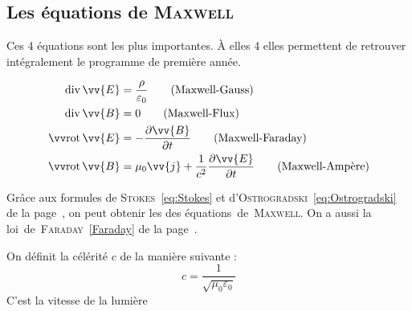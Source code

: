 \documentclass[11pt,a4paper,fleqn,pdftex]{report}
\begin{document}
\subsection{Les équations de \textsc{Maxwell}}
Ces 4 équations sont les plus importantes. À elles 4 elles permettent de retrouver intégralement le programme de première année.
\begin{itheorem}
\begin{changemargin}{5mm}{2cm}
\begin{align}
\diverg \vv{E}&=\dfrac{\rho}{\varepsilon_0}\label{eq:MaxwellGauss}\tag{Maxwell-Gauss}\\
\diverg \vv{B}&=0\label{eq:MaxwellFlux}\tag{Maxwell-Flux}\\
\rot \vv{E}&=-\dfrac{\partial\vv{B}}{\partial t}\label{eq:MaxwellFaraday}\tag{Maxwell-Faraday}\\
\rot \vv{B}&=\mu_0 \vv{j}+\frac{1}{c^2} \dfrac{\partial\vv{E}}{\partial t}\label{eq:MaxwellAmpere}\tag{Maxwell-Ampère}
\end{align}
\end{changemargin}
\end{itheorem}
Grâce aux formules de \textsc{Stokes}~\eqref{eq:Stokes} et d'\textsc{Ostrogradski}~\eqref{eq:Ostrogradski} de la page~\pageref{eq:Stokes}, on peut obtenir les  des équations~de~\textsc{Maxwell}. 
%
%
On a aussi la loi~de~\textsc{Faraday}~\eqref{Faraday} de la page~\pageref{Faraday}.
%
%
\begin{dfn}
On définit la célérité $c$ de la manière suivante : 
\begin{equation}
c=\dfrac{1}{\sqrt{\mu_0 \varepsilon_0}}
\end{equation}
C'est la vitesse de la lumière
\end{dfn}
\end{document}
